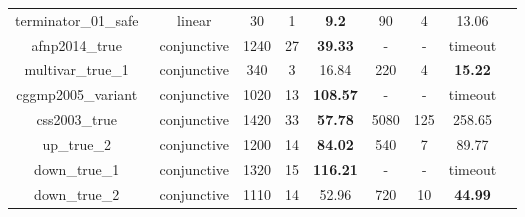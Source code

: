 \begin{table}[t]
\begin{tabular}{l c | c c c | c c c | c }
\multicolumn{1}{|c|}{terminator\_01\_safe~\cite{beyer:SVCOMP:2013}}         		&linear 		&30 &1 &\textbf{9.2}  			&90  &4  &13.06  			&\multicolumn{1}{|c|}{\cmark} \\
\multicolumn{1}{|c|}{afnp2014\_true~\cite{Dirk:SVCOMP:2016}}         			&conjunctive	&1240 &27 &\textbf{39.33}		&- &- &timeout  		&\multicolumn{1}{|c|}{\xmark} \\
\multicolumn{1}{|c|}{multivar\_true\_1~\cite{Dirk:SVCOMP:2016}}         		&conjunctive 	&340 &3 &16.84  				&220 &4   &\textbf{15.22}  	&\multicolumn{1}{|c|}{\cmark} \\
\multicolumn{1}{|c|}{cggmp2005\_variant~\cite{Dirk:SVCOMP:2016}}   				&conjunctive 	&1020 &13 &\textbf{108.57}		&- &- &timeout  		&\multicolumn{1}{|c|}{\cmark} \\
\multicolumn{1}{|c|}{css2003\_true~\cite{Dirk:SVCOMP:2016}}         			&conjunctive 	&1420 &33 &\textbf{57.78}		&5080 &125 &258.65  		&\multicolumn{1}{|c|}{\cmark} \\
\multicolumn{1}{|c|}{up\_true\_2~\cite{Dirk:SVCOMP:2016}}         				&conjunctive 	&1200 &14 &\textbf{84.02}  		&540 &7   &89.77  			&\multicolumn{1}{|c|}{\cmark} \\
\multicolumn{1}{|c|}{down\_true\_1~\cite{Dirk:SVCOMP:2016}}         			&conjunctive 	&1320  &15 &\textbf{116.21}  	&-  &-  &timeout  		&\multicolumn{1}{|c|}{\cmark} \\
\multicolumn{1}{|c|}{down\_true\_2~\cite{Dirk:SVCOMP:2016}}         			&conjunctive 	&1110 &14 &52.96  				&720 &10   &\textbf{44.99}  &\multicolumn{1}{|c|}{\cmark} \\

\hline
\end{tabular}
\label{tbl:stats}
\end{table}

